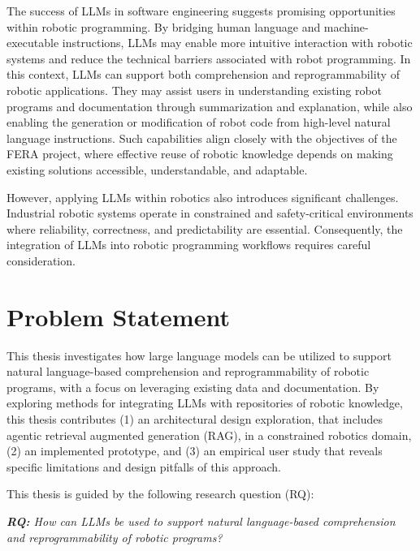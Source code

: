 The success of LLMs in software engineering suggests promising opportunities within robotic programming. By bridging human language and machine-executable instructions, LLMs may enable more intuitive interaction with robotic systems and reduce the technical barriers associated with robot programming. In this context, LLMs can support both comprehension and reprogrammability of robotic applications. They may assist users in understanding existing robot programs and documentation through summarization and explanation, while also enabling the generation or modification of robot code from high-level natural language instructions. Such capabilities align closely with the objectives of the FERA project, where effective reuse of robotic knowledge depends on making existing solutions accessible, understandable, and adaptable.

However, applying LLMs within robotics also introduces significant challenges. Industrial robotic systems operate in constrained and safety-critical environments where reliability, correctness, and predictability are essential. Consequently, the integration of LLMs into robotic programming workflows requires careful consideration.


\section{Problem Statement} \label{sec:introduction:problem-statement}
This thesis investigates how large language models can be utilized to support natural language-based comprehension and reprogrammability of robotic programs, with a focus on leveraging existing data and documentation. By exploring methods for integrating LLMs with repositories of robotic knowledge, this thesis contributes (1) an architectural design exploration, that includes agentic retrieval augmented generation (RAG), in a constrained robotics domain, (2) an implemented prototype, and (3) an empirical user study that reveals specific limitations and design pitfalls of this approach.

This thesis is guided by the following research question (RQ):
\begin{adjustwidth}{\indentWidthTwenty}{\indentWidthTwenty}
    \textit{\textbf{RQ:} How can LLMs be used to support natural language-based comprehension and reprogrammability of robotic programs?}
\end{adjustwidth}

